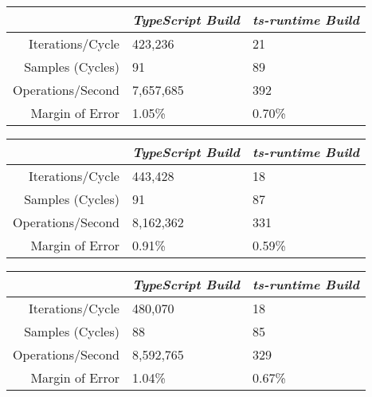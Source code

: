 \begin{center}
{
\centering
\tabulinesep=1.2mm
\setlength{\tabcolsep}{5mm}
\def\arraystretch{1.25}
\small
\begin{tabu} to \textwidth {|r||X[c,m]|X[c,m]|}
  \hline
  & \emph{TypeScript Build} & \emph{ts-runtime Build} \\
  \hline
  \hline
  Iterations/Cycle  & 423,236 & 21 \\
  \hline
  Samples (Cycles)  & 91 & 89 \\
  \hline
  Operations/Second & 7,657,685 & 392 \\
  \hline
  Margin of Error   & 1.05\% & 0.70\% \\
  \hline
\end{tabu}
}
\end{center}

\begin{center}
{
\centering
\tabulinesep=1.2mm
\setlength{\tabcolsep}{5mm}
\def\arraystretch{1.25}
\small
\begin{tabu} to \textwidth {|r||X[c,m]|X[c,m]|}
  \hline
  & \emph{TypeScript Build} & \emph{ts-runtime Build} \\
  \hline
  \hline
  Iterations/Cycle  & 443,428 & 18 \\
  \hline
  Samples (Cycles)  & 91 & 87 \\
  \hline
  Operations/Second & 8,162,362 & 331 \\
  \hline
  Margin of Error   & 0.91\% & 0.59\% \\
  \hline
\end{tabu}
}
\end{center}

\begin{center}
{
\centering
\tabulinesep=1.2mm
\setlength{\tabcolsep}{5mm}
\def\arraystretch{1.25}
\small
\begin{tabu} to \textwidth {|r||X[c,m]|X[c,m]|}
  \hline
  & \emph{TypeScript Build} & \emph{ts-runtime Build} \\
  \hline
  \hline
  Iterations/Cycle  & 480,070 & 18 \\
  \hline
  Samples (Cycles)  & 88 & 85 \\
  \hline
  Operations/Second & 8,592,765 & 329 \\
  \hline
  Margin of Error   & 1.04\% & 0.67\% \\
  \hline
\end{tabu}
}
\end{center}

